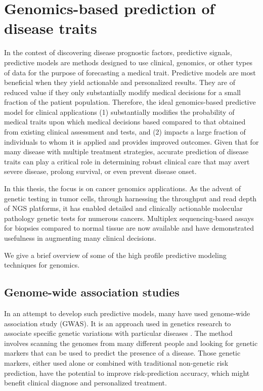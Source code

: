 \section{Genomics-based prediction of disease traits}
\label{sec:Prediction}
In the contest of discovering disease prognostic factors, predictive signals, predictive models are methods designed to use clinical, genomics, or other types of data for the purpose of forecasting a medical trait. Predictive models are most beneficial when they yield actionable and personalized results. They are of reduced value  if they only substantially modify medical decisions for a small fraction of the patient population. Therefore, the ideal genomics-based predictive model for clinical applications (1) substantially modifies the probability of medical traits upon which medical decisions based compared to that obtained from existing clinical assessment and tests, and (2) impacts a large fraction of individuals to whom it is applied and provides improved outcomes. Given that for many disease with multiple treatment strategies, accurate prediction of disease traits can play a critical role in determining robust clinical care that may avert severe disease, prolong survival, or even prevent disease onset. 

In this thesis, the focus is on cancer genomics applications. As the advent of genetic testing in tumor cells, through harnessing the throughput and read depth of NGS platforms, it has enabled detailed and clinically actionable molecular pathology genetic tests for numerous cancers. Multiplex sequencing-based assays for biopsies compared to normal tissue are now available and have demonstrated usefulness in augmenting many clinical decisions.

We give a brief overview of some of the high profile predictive modeling techniques for genomics. 

\subsection{Genome-wide association studies}
In an attempt to develop such predictive models, many have used genome-wide association study (GWAS). It is an approach used in genetics research to associate specific genetic variations with particular diseases \citep{manolio2010genomewide}. The method involves scanning the genomes from many different people and looking for genetic markers that can be used to predict the presence of a disease. Those genetic markers, either used alone or combined with traditional non-genetic risk prediction, have the potential to improve risk-prediction accuracy, which might beneﬁt clinical diagnose and personalized treatment.

